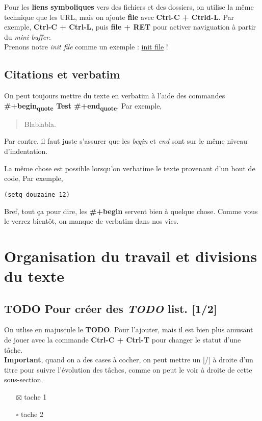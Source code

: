 \documentclass{article}
\numberwithin{equation}{section}
\begin{document}
Pour les \textbf{liens symboliques} vers des fichiers et des dossiers, on utilise la même technique que les URL, mais on ajoute \textbf{file} avec \textbf{Ctrl-C + Ctrld-L}. 
Par exemple, \textbf{Ctrl-C + Ctrl-L}, puis \textbf{file + RET} pour activer naviguation à partir du \emph{mini-buffer}.\\[0pt]

Prenons notre \emph{init file} comme un exemple :  \href{.emacs.d/init.el}{init file} !

\subsection{Citations et verbatim}
\label{sec:org6d36e50}
On peut toujours mettre du texte en verbatim à l'aide des commandes \textbf{\#+begin\textsubscript{quote} Test \#+end\textsubscript{quote}}.
Par exemple,
\begin{quote}
Blablabla.
\end{quote}
Par contre, il faut juste s'assurer que les \emph{begin} et \emph{end} sont sur le même niveau d'indentation. 

La même chose est possible lorsqu'on verbatime le texte provenant d'un bout de code,
Par exemple,
\begin{verbatim}
(setq douzaine 12)
\end{verbatim}

Bref, tout ça pour dire, les \textbf{\#+begin} servent bien à quelque chose.
Comme vous le verrez bientôt, on manque de verbatim dans nos vies. 

\section{Organisation du travail et divisions du texte}
\label{sec:orgd47a1ac}
\subsection{{\bfseries\sffamily TODO} Pour créer des \emph{TODO} list. [1/2]}
\label{sec:orge47ccc4}
On utlise en majuscule le \textbf{TODO}. Pour l'ajouter, mais il est bien plus amusant de jouer avec la commande \textbf{Ctrl-C + Ctrl-T} pour changer le statut d'une tâche.\\[0pt]

\textbf{Important}, quand on a des cases à cocher, on peut mettre un [/] à droite d'un titre pour suivre l'évolution des tâches, comme on peut le voir à droite de cette sous-section.
\begin{itemize}
\item[{$\boxtimes$}] tache 1
\item[{$\square$}] tache 2
\end{itemize}
\end{document}
